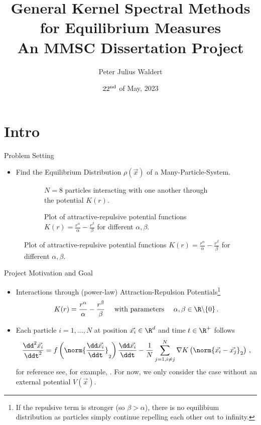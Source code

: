 \documentclass[aspectratio=169, hyperref={colorlinks=true}]{beamer}
\title{General Kernel Spectral Methods for Equilibrium Measures \\ \normalsize An MMSC Dissertation Project}
\author{Peter Julius Waldert}
\institute{Mathematical Institute \\ University of Oxford}
\date{$22^{\rm nd}$ of May, 2023}
\begin{document}
  {\frame{\titlepage}}

  \section{Intro}
  \begin{frame}{Problem Setting}
    \begin{itemize}
      \item Find the Equilibrium Distribution $\rho(\vec{x})$ of a Many-Particle-System.
    \end{itemize}
    \begin{figure}[H]
      \centering
      \begin{subfigure}[t]{0.5\textwidth}
        \centering
        \caption*{$N = 8$ particles interacting with one another through the potential $K(r)$.}
      \end{subfigure}
      \hfill
      \begin{subfigure}[t]{0.49\textwidth}
        \centering
        \caption*{Plot of attractive-repulsive potential functions $K(r) = \frac{r^\alpha}{\alpha} - \frac{r^\beta}{\beta}$ for different $\alpha, \beta$.}
      \end{subfigure}
    \end{figure}
  \end{frame}

  {
  \begin{frame}{Project Motivation and Goal}
    \vspace{0.4cm}
    \begin{itemize}
      \item Interactions through (power-law) Attraction-Repulsion Potentials\footnote{If the repulsive term is stronger (so $\beta > \alpha$), there is no equilibium distribution as particles simply continue repelling each other out to infinity.}
            $$K(r) = \frac{r^\alpha}{\alpha} - \frac{r^\beta}{\beta}\quad \text{ with parameters } \quad \alpha, \beta \in \R \backslash \{0\}\,.$$
      \item Each particle $i=1, ..., N$ at position $\vec{x_i} \in \R^d$ and time $t \in \R^+$ follows
            $$\frac{\dd^2 \vec{x_i}}{\ddt^2} = f\left(\norm{\frac{\dd \vec{x_i}}{\ddt}}_2\right) \frac{\dd\vec{x_i}}{\ddt} - \frac{1}{N} \sum_{j=1, i\neq j}^{N} \nabla K\left(\norm{\vec{x_i} - \vec{x_j}}_2\right)\,,$$
            for reference see, for example, \parencite{2020-power-law-kernels, 2021-arbitrary-dimensions}.
            For now, we only consider the case without an external potential $V(\vec{x})$.
    \end{itemize}
  \end{frame}
  }
\end{document}
